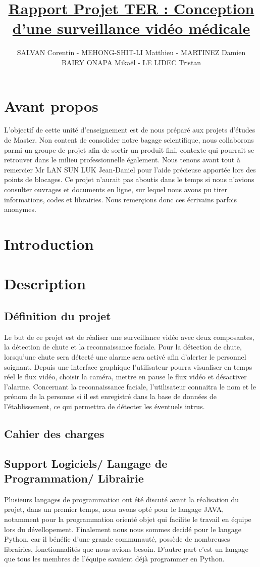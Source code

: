 \documentclass[a4paper]{report}
\author{SALVAN Corentin - MEHONG-SHIT-LI Matthieu - MARTINEZ Damien \\ BAIRY ONAPA Mikaël - LE LIDEC Tristan}
\title{\underline{Rapport Projet TER : Conception d'une surveillance vidéo médicale}}
\begin{document}
    \maketitle
    
    \chapter{Avant propos}

    L'objectif de cette unité d'enseignement est de nous préparé aux projets d'études de Master.
    Non content de consolider notre bagage scientifique, nous collaborons parmi un groupe de projet
    afin de sortir un produit fini, contexte qui pourrait se retrouver dans le milieu professionnelle
    également.
    Nous tenons avant tout à remercier Mr LAN SUN LUK Jean-Daniel pour l'aide précieuse apportée
    lors des points de blocages. Ce projet n'aurait pas aboutis dans le temps si nous n'avions consulter
    ouvrages et documents en ligne, sur lequel nous avons pu tirer informations, codes et librairies.
    Nous remerçions donc ces écrivains parfois anonymes.
    
    \chapter{Introduction}
    \chapter{Description}
        \section{Définition du projet}
    Le but de ce projet est de réaliser une surveillance vidéo avec deux composantes, la détection de chute et la reconnaissance faciale.
    Pour la détection de chute, lorsqu'une chute sera détecté une alarme sera activé afin d'alerter le personnel soignant. Depuis une interface graphique l'utilisateur pourra visualiser en temps réel le flux vidéo, choisir la caméra, mettre en pause le flux vidéo et désactiver l'alarme. Concernant la reconnaissance faciale, l'utilisateur connaitra le nom et le prénom de la personne si il est enregistré dans la base de données de l'établissement, ce qui permettra de détecter les éventuels intrus.
        \section{Cahier des charges}
        \section{Support Logiciels/ Langage de Programmation/ Librairie}
        Plusieurs langages de programmation ont été discuté avant la réalisation du projet, dans un premier temps, nous avons opté pour le langage JAVA, notamment pour la programmation orienté objet qui facilite le travail en équipe lors du dévellopement. Finalement nous nous sommes decidé pour le langage Python, car il bénéfie d'une grande communauté, possède de nombreuses librairies, fonctionnalités que nous avions besoin. D'autre part c'est un langage que tous les membres de l'équipe savaient déjà programmer en Python.
\end{document}
